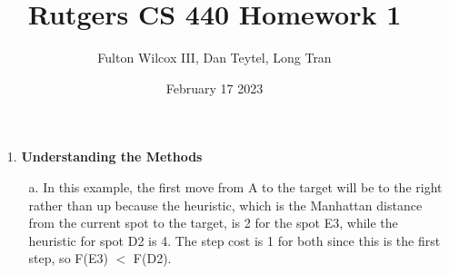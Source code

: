 \documentclass{article}
\title{Rutgers CS 440 Homework 1}
\author{Fulton Wilcox III, Dan Teytel, Long Tran}
\date{February 17 2023}
\begin{document}
\maketitle

    \begin{enumerate}
        \item[1.] \textbf{Understanding the Methods}
        \begin{enumerate}

            \begin{figure}[h!]
		\end{figure}
            
            \item[a.] In this example, the first move from A to the target will be to the right rather than up because the heuristic, which is the Manhattan distance from the current spot to the target, is 2 for the spot E3, while the heuristic for spot D2 is 4.  The step cost is 1 for both since this is the first step, so F(E3) $<$ F(D2).


\end{enumerate}
\end{enumerate}
\end{document}
